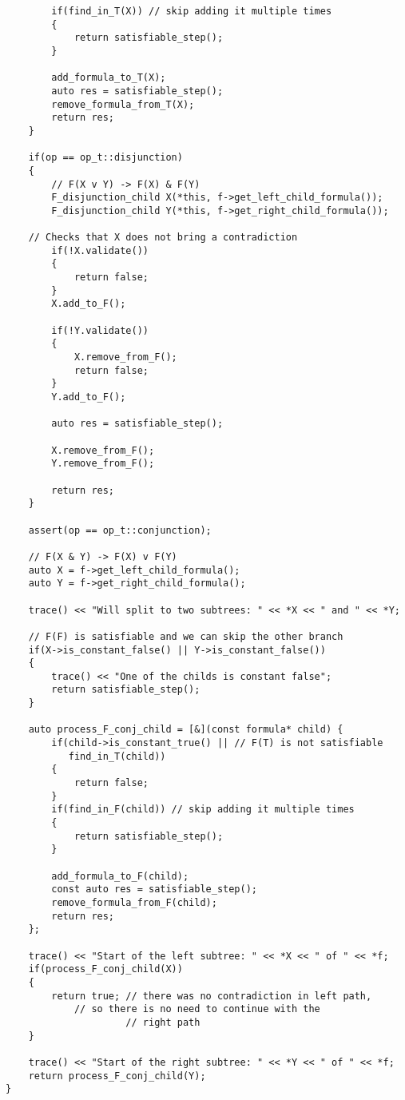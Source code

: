 \documentclass{article}
\begin{document}
\begin{lstlisting}
        if(find_in_T(X)) // skip adding it multiple times
        {
            return satisfiable_step();
        }

        add_formula_to_T(X);
        auto res = satisfiable_step();
        remove_formula_from_T(X);
        return res;
    }

    if(op == op_t::disjunction)
    {
        // F(X v Y) -> F(X) & F(Y)
        F_disjunction_child X(*this, f->get_left_child_formula());
        F_disjunction_child Y(*this, f->get_right_child_formula());

	// Checks that X does not bring a contradiction
        if(!X.validate()) 
        {
            return false;
        }
        X.add_to_F();

        if(!Y.validate())
        {
            X.remove_from_F();
            return false;
        }
        Y.add_to_F();

        auto res = satisfiable_step();

        X.remove_from_F();
        Y.remove_from_F();

        return res;
    }

    assert(op == op_t::conjunction);

    // F(X & Y) -> F(X) v F(Y)
    auto X = f->get_left_child_formula();
    auto Y = f->get_right_child_formula();

    trace() << "Will split to two subtrees: " << *X << " and " << *Y;

    // F(F) is satisfiable and we can skip the other branch
    if(X->is_constant_false() || Y->is_constant_false())
    {
        trace() << "One of the childs is constant false";
        return satisfiable_step();
    }

    auto process_F_conj_child = [&](const formula* child) {
        if(child->is_constant_true() || // F(T) is not satisfiable
           find_in_T(child))
        {
            return false;
        }
        if(find_in_F(child)) // skip adding it multiple times
        {
            return satisfiable_step();
        }

        add_formula_to_F(child);
        const auto res = satisfiable_step();
        remove_formula_from_F(child);
        return res;
    };

    trace() << "Start of the left subtree: " << *X << " of " << *f;
    if(process_F_conj_child(X))
    {
        return true; // there was no contradiction in left path,
			// so there is no need to continue with the
                     // right path
    }

    trace() << "Start of the right subtree: " << *Y << " of " << *f;
    return process_F_conj_child(Y);
}
				\end{lstlisting}
	\newpage
\end{document}
